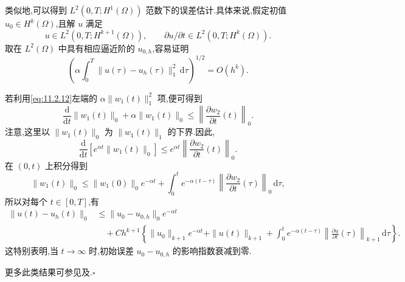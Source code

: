 类似地,可以得到 \(L^2(0,T;H^1(\Omega))\) 范数下的误差估计.具体来说,假定初值 \(u_0\in H^k(\Omega)\),且解 \(u\) 满足
\[
  u\in L^2(0,T;H^{k+1}(\Omega)),\qquad
  \partial u/\partial t\in L^2(0,T;H^k(\Omega)).
\]
取在 \(L^2(\Omega)\) 中具有相应逼近阶的 \(u_{0,h}\),容易证明
\[
  \left(\alpha\int_0^T\|u(\tau)-u_h(\tau)\|_1^2\,\mathrm d\tau\right)^{1/2}=O(h^k).
\]

\begin{note}
若利用\eqref{eq:11.2.12}左端的 \(\alpha\|w_1(t)\|_1^2\) 项,便可得到
\[
  \frac{\mathrm d}{\mathrm dt}\|w_1(t)\|_0+\alpha\|w_1(t)\|_0
       \le\left\|\frac{\partial w_2}{\partial t}(t)\right\|_0.
\]
注意,这里以 \(\|w_1(t)\|_0\) 为 \(\|w_1(t)\|_1\) 的下界.因此,
\[
  \frac{\mathrm d}{\mathrm dt}[e^{\alpha t}\|w_1(t)\|_0]
      \le e^{\alpha t}\left\|\frac{\partial w_2}{\partial t}(t)\right\|_0.
\]
在 \((0,t)\) 上积分得到
\begin{equation}\label{eq:11.2.13}
  \|w_1(t)\|_0\le\|w_1(0)\|_0e^{-\alpha t}
       +\int_0^t e^{-\alpha(t-\tau)}
                 \left\|\frac{\partial w_2}{\partial t}(\tau)\right\|_0\,\mathrm d\tau,
\end{equation}
所以对每个 \(t\in[0,T]\),有
\[
  \begin{aligned}
    \|u(t)-u_h(t)\|_0
     &\le\|u_0-u_{0,h}\|_0e^{-\alpha t}\\
     &\quad+Ch^{k+1}\left\{\|u_0\|_{k+1}e^{-\alpha t}+\|u(t)\|_{k+1}
             +\int_0^t e^{-\alpha(t-\tau)}
                  \left\|\frac{\partial u}{\partial t}(\tau)\right\|_{k+1}\,\mathrm d\tau\right\}.
  \end{aligned}
\]
这特别表明,当 \(t\to\infty\) 时,初始误差 \(u_0-u_{0,h}\) 的影响指数衰减到零.

更多此类结果可参见及.\hfill\(\square\)
\end{note}

